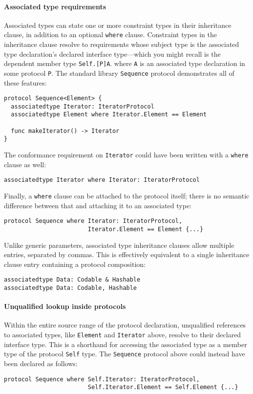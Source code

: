 \documentclass[a4paper,headsepline,bibliography=totoc,toc=flat,fleqn,twoside=semi]{scrbook}
\theoremstyle{definition}
\theoremstyle{definition}
\theoremstyle{definition}
\begin{document}
\paragraph{Associated type requirements}
Associated types can state one or more constraint types in their inheritance clause, in addition to an optional \texttt{where} clause. Constraint types in the inheritance clause resolve to requirements whose subject type is the associated type declaration's declared interface type---which you might recall is the dependent member type \texttt{Self.[P]A}. where \texttt{A} is an associated type declaration in some protocol \texttt{P}. The standard library \texttt{Sequence} protocol demonstrates all of these features:
\begin{Verbatim}
protocol Sequence<Element> {
  associatedtype Iterator: IteratorProtocol
  associatedtype Element where Iterator.Element == Element

  func makeIterator() -> Iterator
}
\end{Verbatim}
The conformance requirement on \texttt{Iterator} could have been written with a \texttt{where} clause as well:
\begin{Verbatim}
associatedtype Iterator where Iterator: IteratorProtocol
\end{Verbatim}
Finally, a \texttt{where} clause can be attached to the protocol itself; there is no semantic difference between that and attaching it to an associated type:
\begin{Verbatim}
protocol Sequence where Iterator: IteratorProtocol,
                        Iterator.Element == Element {...}
\end{Verbatim}
Unlike generic parameters, associated type inheritance clauses allow multiple entries, separated by commas. This is effectively equivalent to a single inheritance clause entry containing a protocol composition:
\begin{Verbatim}
associatedtype Data: Codable & Hashable
associatedtype Data: Codable, Hashable
\end{Verbatim}
\paragraph{Unqualified lookup inside protocols}
Within the entire source range of the protocol declaration, unqualified references to associated types, like \texttt{Element} and \texttt{Iterator} above, resolve to their declared interface type. This is a shorthand for accessing the associated type as a member type of the protocol \texttt{Self} type. The \texttt{Sequence} protocol above could instead have been declared as follows:
\begin{Verbatim}
protocol Sequence where Self.Iterator: IteratorProtocol,
                        Self.Iterator.Element == Self.Element {...}
\end{Verbatim}
\end{document}
